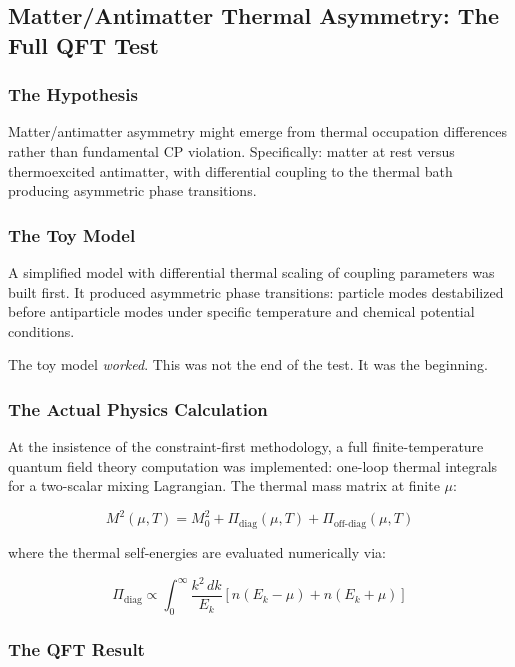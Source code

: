 \documentclass[11pt]{article}
\begin{document}
\subsection{Matter/Antimatter Thermal Asymmetry: The Full QFT Test}

\subsubsection{The Hypothesis}

Matter/antimatter asymmetry might emerge from thermal occupation differences rather than fundamental CP violation. Specifically: matter at rest versus thermoexcited antimatter, with differential coupling to the thermal bath producing asymmetric phase transitions.

\subsubsection{The Toy Model}

A simplified model with differential thermal scaling of coupling parameters was built first. It produced asymmetric phase transitions: particle modes destabilized before antiparticle modes under specific temperature and chemical potential conditions.

The toy model \textit{worked}. This was not the end of the test. It was the beginning.

\subsubsection{The Actual Physics Calculation}

At the insistence of the constraint-first methodology, a full finite-temperature quantum field theory computation was implemented: one-loop thermal integrals for a two-scalar mixing Lagrangian. The thermal mass matrix at finite $\mu$:

\begin{equation}
  M^2(\mu, T) = M^2_0 + \Pi_{\text{diag}}(\mu, T) + \Pi_{\text{off-diag}}(\mu, T)
\end{equation}

where the thermal self-energies are evaluated numerically via:

\begin{equation}
  \Pi_{\text{diag}} \propto \int_0^\infty \frac{k^2\,dk}{E_k} \left[ n(E_k - \mu) + n(E_k + \mu) \right]
\end{equation}

\subsubsection{The QFT Result}
\end{document}
